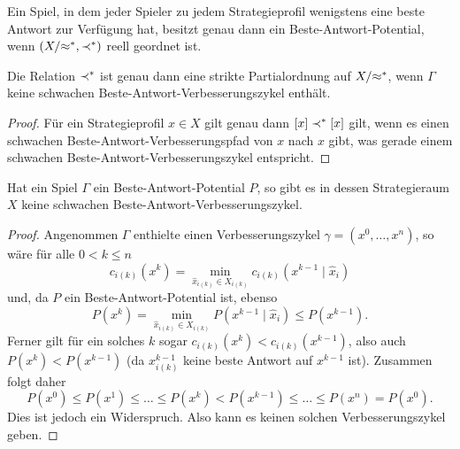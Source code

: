 \begin{satz}\label{satz:CharExBAPot}
	Ein Spiel, in dem jeder Spieler zu jedem Strategieprofil wenigstens eine beste Antwort zur Verfügung hat, besitzt genau dann ein Beste-Antwort-Potential, wenn  $(X/{\approx^\ast}, \prec^\ast)$ reell geordnet ist.
\end{satz}

\begin{prop}\label{prop:BARelPartOrdVerbz}
	Die Relation $\prec^\ast$ ist genau dann eine strikte Partialordnung auf $X/{\approx^\ast}$, wenn $\Gamma$ keine schwachen Beste-Antwort-Verbesserungszykel enthält.
\end{prop}

\begin{proof}
	Für ein Strategieprofil $x \in X$ gilt genau dann $[x] \prec^\ast [x]$ gilt, wenn es einen schwachen Beste-Antwort-Verbesserungspfad von $x$ nach $x$ gibt, was gerade einem schwachen Beste-Antwort-Verbesserungszykel entspricht.
\end{proof}

\begin{prop}\label{prop:BAPotKeineschwBAVBZ}
	Hat ein Spiel $\Gamma$ ein Beste-Antwort-Potential $P$, so gibt es in dessen Strategieraum $X$ keine schwachen Beste-Antwort-Verbesserungszykel.
\end{prop}

\begin{proof}
	Angenommen $\Gamma$ enthielte einen Verbesserungszykel $\gamma = (x^0, \dots, x^n)$, so wäre für alle $0 < k \leq n$
		\[c_{i(k)}(x^k) = \min_{\hat{x}_{i(k)} \in X_{i(k)}} c_{i(k)}(x^{k-1} \mid \hat{x}_i)\]
	und, da $P$ ein Beste-Antwort-Potential ist, ebenso 
		\[P(x^k) = \min_{\hat{x}_{i(k)} \in X_{i(k)}} P(x^{k-1} \mid \hat{x}_i) \leq P(x^{k-1}).\]
	Ferner gilt für ein solches $k$ sogar $c_{i(k)}(x^k) < c_{i(k)}(x^{k-1})$, also auch $P(x^k) < P(x^{k-1})$ (da $x^{k-1}_{i(k)}$ keine beste Antwort auf $x^{k-1}$ ist). Zusammen folgt daher
		\[P(x^0) \leq P(x^1) \leq \dots \leq P(x^k) < P(x^{k-1}) \leq \dots \leq P(x^n) = P(x^0).\]
	Dies ist jedoch ein Widerspruch. Also kann es keinen solchen Verbesserungszykel geben.
\end{proof}


